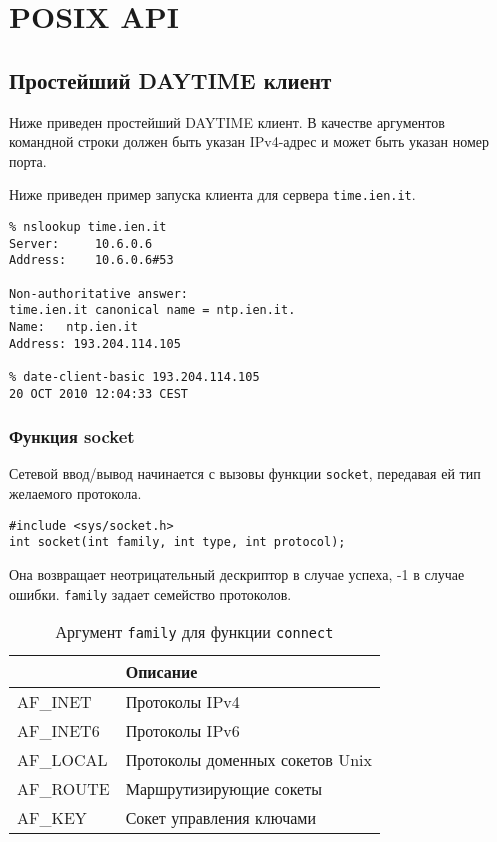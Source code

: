 \section{POSIX API}
\label{sec:network-api}

\subsection{Простейший DAYTIME клиент}
Ниже приведен простейший DAYTIME клиент. В качестве аргументов командной строки должен быть указан IPv4-адрес и может быть указан номер порта.

\lstset{label=lst:date-client-basic,caption=Простейший DAYTIME клиент}


Ниже приведен пример запуска клиента для сервера \texttt{time.ien.it}.

\lstset{language=,label=lst:basic-client-run,caption=Использование}
\begin{lstlisting}
% nslookup time.ien.it
Server:		10.6.0.6
Address:	10.6.0.6#53

Non-authoritative answer:
time.ien.it	canonical name = ntp.ien.it.
Name:	ntp.ien.it
Address: 193.204.114.105

% date-client-basic 193.204.114.105
20 OCT 2010 12:04:33 CEST
\end{lstlisting}

\subsubsection{Функция socket}
Сетевой ввод/вывод начинается с вызовы функции \lstinline{socket}, передавая ей тип желаемого протокола.
\lstset{language=C,caption=}
\begin{lstlisting}
#include <sys/socket.h>
int socket(int family, int type, int protocol);
\end{lstlisting}

Она возвращает неотрицательный дескриптор в случае успеха, -1 в случае ошибки. \lstinline{family} задает семейство протоколов.
\begin{table}[h!]
  \caption{Аргумент \lstinline{family} для функции \lstinline{connect}}
  \begin{center}
    \begin{tabular}{p{2.5cm}l}
      \toprule
      & \textbf{Описание} \\
      \midrule
      AF\_INET & Протоколы IPv4 \\
      AF\_INET6 & Протоколы IPv6 \\
      AF\_LOCAL & Протоколы доменных сокетов Unix \\
      AF\_ROUTE & Маршрутизирующие сокеты \\
      AF\_KEY & Сокет управления ключами \\
      \bottomrule
    \end{tabular}
  \end{center}
\end{table}

